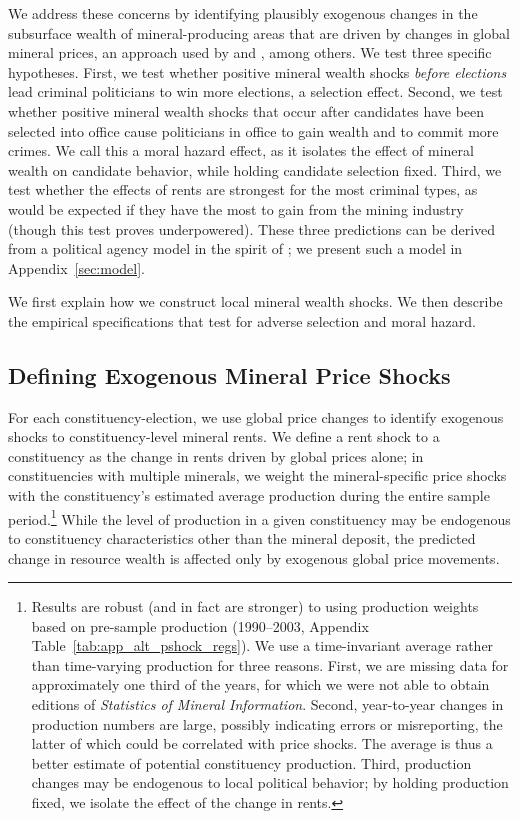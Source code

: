 \documentclass[12pt,letterpaper]{article}
\begin{document}
We address these concerns by identifying plausibly exogenous changes
in the subsurface wealth of mineral-producing areas that are driven by
changes in global mineral prices, an approach used by
 and , among others.
We test three specific hypotheses. First, we test whether positive
mineral wealth shocks \textit{before elections} lead criminal
politicians to win more elections, a selection effect. Second, we test
whether positive mineral wealth shocks that occur after candidates
have been selected into office cause politicians in office to gain
wealth and to commit more crimes. We call this a moral hazard effect,
as it isolates the effect of mineral wealth on candidate behavior,
while holding candidate selection fixed. Third, we test whether the
effects of rents are strongest for the most criminal types, as would
be expected if they have the most to gain from the mining industry
(though this test proves underpowered).  These three predictions can
be derived from a political agency model in the spirit of
; we present such a model in
Appendix~\ref{sec:model}.

We first explain how we construct local mineral wealth shocks. We then
describe the empirical specifications that test for
adverse selection and moral hazard.

\subsection{Defining Exogenous Mineral Price Shocks}

For each constituency-election, we use global price changes to
identify exogenous shocks to constituency-level mineral rents.  We
define a rent shock to a constituency as the change in rents driven by
global prices alone; in constituencies with multiple minerals, we
weight the mineral-specific price shocks with the constituency's
estimated average production during the entire sample
period.\footnote{Results are robust (and in fact are stronger) to
  using production weights based on pre-sample production (1990--2003,
  Appendix Table~\ref{tab:app_alt_pshock_regs}). We use a
  time-invariant average rather than time-varying production for three
  reasons. First, we are missing data for approximately one third of
  the years, for which we were not able to obtain editions of
  \textit{Statistics of Mineral Information}. Second, year-to-year
  changes in production numbers are large, possibly indicating errors
  or misreporting, the latter of which could be correlated with price
  shocks. The average is thus a better estimate of potential
  constituency production. Third, production changes may be endogenous
  to local political behavior; by holding production fixed, we isolate
  the effect of the change in rents.}  While the level of
production in a given constituency may be endogenous to constituency
characteristics other than the mineral deposit, the predicted change
in resource wealth is affected only by exogenous global price
movements.
\end{document}
